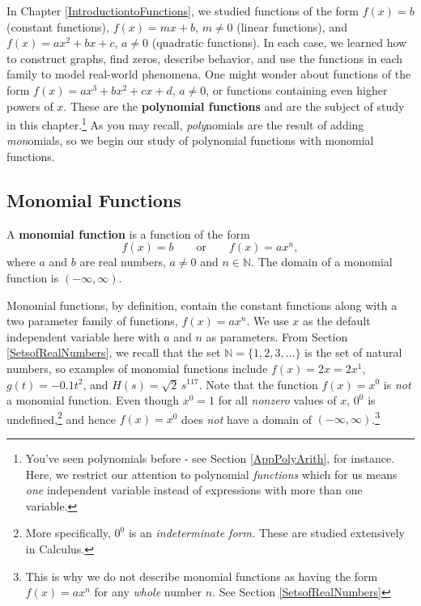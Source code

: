 

\setcounter{footnote}{0}

\label{GraphsofPolynomials}

In Chapter \ref{IntroductiontoFunctions}, we studied functions of the form $f(x) = b$ (constant functions), $f(x) = mx+b$, $m \neq 0$ (linear functions), and $f(x) = ax^2+bx+c$, $a \neq 0$ (quadratic functions).  In each case, we learned how to construct graphs, find zeros, describe behavior, and use the functions in each family to model real-world phenomena.  One might wonder about functions of the form $f(x) = ax^3+bx^2+cx+d$, $a \neq 0$, or functions containing even higher powers of $x$.  These are the \textbf{polynomial functions} and are the subject of study in this chapter.\footnote{You've seen polynomials before - see Section \ref{AppPolyArith}, for instance.  Here, we restrict our attention to polynomial \textit{functions} which for us means \textit{one} independent variable instead of expressions with more than one variable.}  As you may recall, \textit{poly}nomials  are the result of adding   \textit{mon}omials, so we begin our study of polynomial functions with monomial functions.  

\subsection{Monomial Functions}
\label{MonomialFunctions}

\colorbox{ResultColor}{\bbm

\begin{defn} \label{monomialfunction} A \textbf{monomial function} is a function of the form \[  f(x) = b \qquad \text{or} \qquad f(x) = a x^{n},\] where $a$ and $b$ are real numbers, $a \neq 0$ and  $n \in \mathbb{N}$.  The domain of a monomial function is $(-\infty, \infty)$.

\end{defn}

\ebm}

\medskip

Monomial functions, by definition, contain the constant functions along with a two parameter family of functions, $f(x) = ax^n$.  We use $x$ as the default independent variable here with $a$ and $n$ as parameters.  From Section \ref{SetsofRealNumbers}, we recall that the set $\mathbb{N} = \{ 1, 2, 3, \ldots \}$ is the set of natural numbers, so examples of monomial functions include $f(x) = 2x = 2x^{1}$, $g(t) = -0.1 t^2$, and $H(s) = \sqrt{2} \, s^{117}$.  Note that the function $f(x) = x^0$ is \textit{not} a monomial function.  Even though $x^0 = 1$ for all \textit{nonzero} values of $x$, $0^{0}$ is undefined,\footnote{More specifically, $0^0$ is an \textit{indeterminate form.}  These are studied extensively in Calculus.} and hence $f(x) = x^0$ does \textit{not} have a domain of $(-\infty, \infty)$.\footnote{This is why we do not describe monomial functions as having the form $f(x) = ax^n$ for any \textit{whole} number $n$. See Section \ref{SetsofRealNumbers}}

